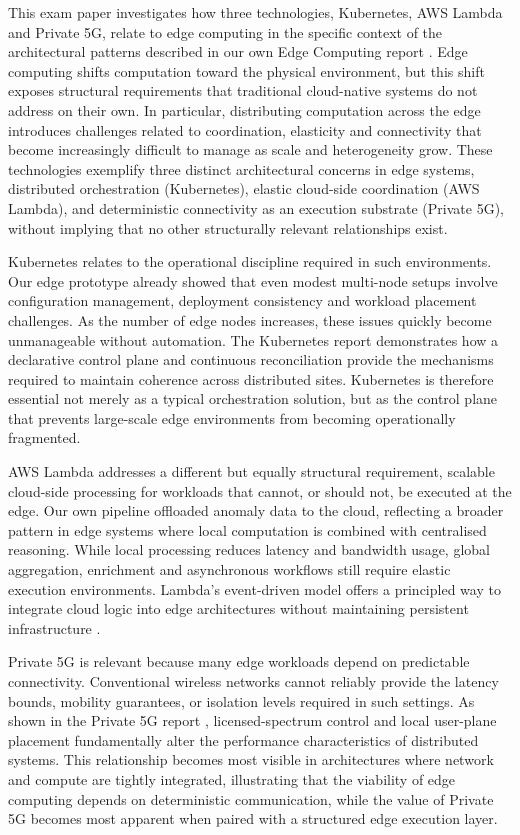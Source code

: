 This exam paper investigates how three technologies, Kubernetes, AWS Lambda and Private 5G, relate to edge computing in the specific context of the architectural patterns described in our own Edge Computing report \cite{edge_computing_report}. Edge computing shifts computation toward the physical environment, but this shift exposes structural requirements that traditional cloud-native systems do not address on their own. In particular, distributing computation across the edge introduces challenges related to coordination, elasticity and connectivity that become increasingly difficult to manage as scale and heterogeneity grow. These technologies exemplify three distinct architectural concerns in edge systems, distributed orchestration (Kubernetes), elastic cloud-side coordination (AWS Lambda), and deterministic connectivity as an execution substrate (Private 5G), without implying that no other structurally relevant relationships exist.

Kubernetes relates to the operational discipline required in such environments. Our edge prototype already showed that even modest multi-node setups involve configuration management, deployment consistency and workload placement challenges. As the number of edge nodes increases, these issues quickly become unmanageable without automation. The Kubernetes report \cite{kubernetes_report} demonstrates how a declarative control plane and continuous reconciliation provide the mechanisms required to maintain coherence across distributed sites. Kubernetes is therefore essential not merely as a typical orchestration solution, but as the control plane that prevents large-scale edge environments from becoming operationally fragmented.

AWS Lambda addresses a different but equally structural requirement, scalable cloud-side processing for workloads that cannot, or should not, be executed at the edge. Our own pipeline offloaded anomaly data to the cloud, reflecting a broader pattern in edge systems where local computation is combined with centralised reasoning. While local processing reduces latency and bandwidth usage, global aggregation, enrichment and asynchronous workflows still require elastic execution environments. Lambda’s event-driven model offers a principled way to integrate cloud logic into edge architectures without maintaining persistent infrastructure \cite{lambda_report}.

Private 5G is relevant because many edge workloads depend on predictable connectivity. Conventional wireless networks cannot reliably provide the latency bounds, mobility guarantees, or isolation levels required in such settings. As shown in the Private 5G report \cite{private_5g_report}, licensed-spectrum control and local user-plane placement fundamentally alter the performance characteristics of distributed systems. This relationship becomes most visible in architectures where network and compute are tightly integrated, illustrating that the viability of edge computing depends on deterministic communication, while the value of Private 5G becomes most apparent when paired with a structured edge execution layer.


